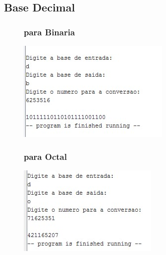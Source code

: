 \documentclass[10pt,a4paper]{article}
\begin{document}
\subsection{Base Decimal}
\begin{figure}[H]
\begin{minipage}[t]{.5\textwidth}
\subsubsection{para Binaria}
\includegraphics[width=\textwidth]{DB.jpg}
\end{minipage}
\begin{minipage}[t]{.5\textwidth}
\subsubsection{para Octal}
\includegraphics[width=\textwidth]{DO.jpg}
\end{minipage}
\begin{minipage}[t]{.5\textwidth}

\end{minipage}
\end{figure}
\end{document}
